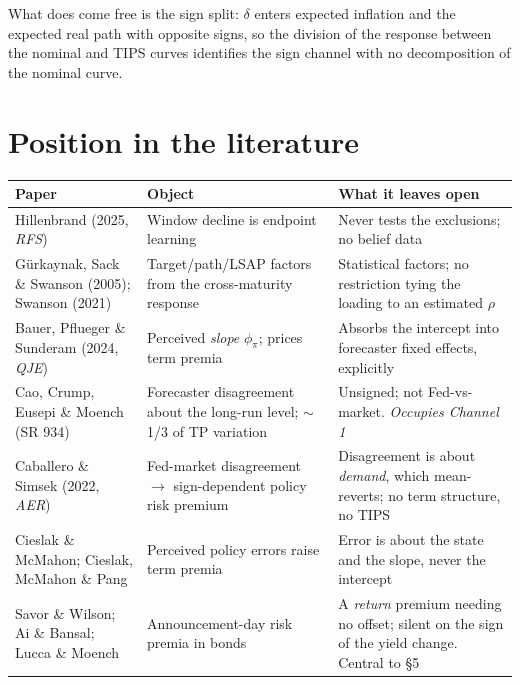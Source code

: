 \documentclass[11pt]{article}
\begin{document}
What does come free is the sign split: $\delta$ enters expected inflation and the expected real
path with opposite signs, so the division of the response between the nominal and TIPS curves
identifies the sign channel with no decomposition of the nominal curve.

\section{Position in the literature}

\begin{center}\footnotesize
\begin{tabular}{@{}p{}p{}p{}@{}}
\toprule
\textbf{Paper} & \textbf{Object} & \textbf{What it leaves open}\\ \midrule
Hillenbrand (2025, \emph{RFS}) & Window decline is endpoint learning & Never tests the exclusions; no belief data\\[0.25em]
Gürkaynak, Sack \& Swanson (2005); Swanson (2021) & Target/path/LSAP factors from the cross-maturity response & Statistical factors; no restriction tying the loading to an estimated $\rho$\\[0.25em]
Bauer, Pflueger \& Sunderam (2024, \emph{QJE}) & Perceived \emph{slope} $\phi_\pi$; prices term premia & Absorbs the intercept into forecaster fixed effects, explicitly\\[0.25em]
Cao, Crump, Eusepi \& Moench (SR 934) & Forecaster disagreement about the long-run level; $\sim$1/3 of TP variation & Unsigned; not Fed-vs-market. \emph{Occupies Channel 1}\\[0.25em]
Caballero \& Simsek (2022, \emph{AER}) & Fed-market disagreement $\to$ sign-dependent policy risk premium & Disagreement is about \emph{demand}, which mean-reverts; no term structure, no TIPS\\[0.25em]
Cieslak \& McMahon; Cieslak, McMahon \& Pang & Perceived policy errors raise term premia & Error is about the state and the slope, never the intercept\\[0.25em]
Savor \& Wilson; Ai \& Bansal; Lucca \& Moench & Announcement-day risk premia in bonds & A \emph{return} premium needing no offset; silent on the sign of the yield change. Central to \S5\\
\bottomrule\end{tabular}
\end{center}
\end{document}

